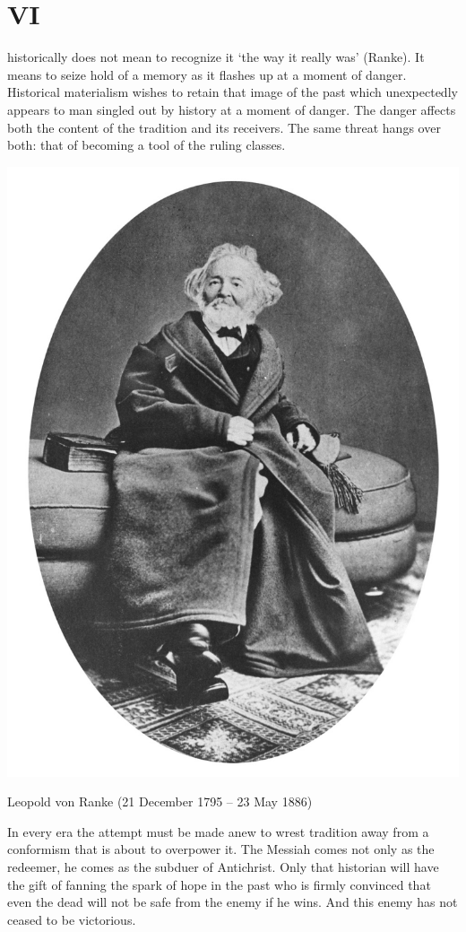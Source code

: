 \documentclass[12pt]{tufte-handout}
\begin{document}
\newpage 	 	 
\section{VI} 	 
 historically does not mean to recognize it `the way it really was' (Ranke). It means to seize hold of a memory as it flashes up at a moment of danger. 
Historical materialism wishes to retain that image of the past which unexpectedly appears to man singled out by history at a moment of danger. The danger affects both the content of the tradition and its receivers. The same threat hangs over both: that of becoming a tool of the ruling classes. 
\begin{marginfigure}%
  \includegraphics[width=\linewidth]{graphics/Leopold_Von_Ranke_1877.jpg}
  \caption{Leopold von Ranke (21 December 1795 – 23 May 1886)}
  \label{fig:Ranke}
\end{marginfigure}
In every era the attempt must be made anew to wrest tradition away from a conformism that is about to overpower it. The Messiah comes not only as the redeemer, he comes as the subduer of Antichrist. Only that historian will have the gift of fanning the spark of hope in the past who is firmly convinced that even the dead will not be safe from the enemy if he wins. And this enemy has not ceased to be victorious.	
\end{document}
